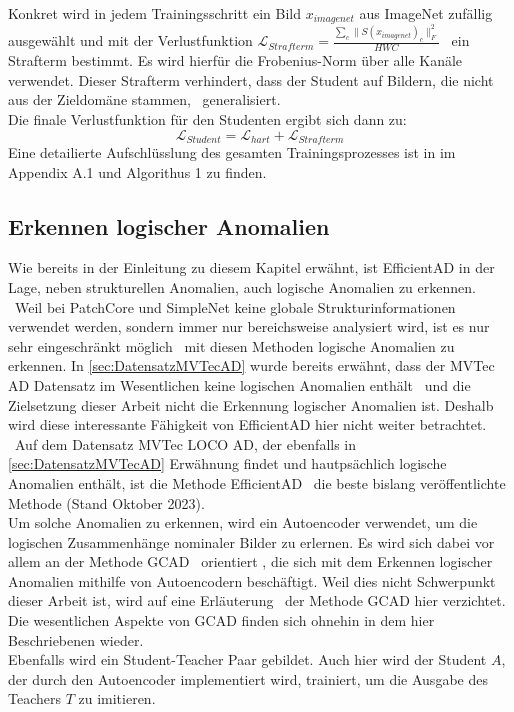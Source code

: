 Konkret wird in jedem Trainingsschritt ein Bild $x_{imagenet}$ aus ImageNet zufällig ausgewählt und mit der Verlustfunktion $\mathcal{L}_{Strafterm}=\frac{\sum_{c}\lVert S(x_{imagenet})_{c} \rVert^{2}_{F}}{HWC}$ \ 
ein Strafterm bestimmt. Es wird hierfür die Frobenius-Norm über alle Kanäle verwendet. Dieser Strafterm verhindert, dass der Student auf Bildern, die nicht aus der Zieldomäne stammen, \
generalisiert. \\
Die finale Verlustfunktion für den Studenten ergibt sich dann zu: \
$$
\mathcal{L}_{Student}= \mathcal{L}_{hart} + \mathcal{L}_{Strafterm} %
$$
Eine detailierte Aufschlüsslung des gesamten Trainingsprozesses ist in \cite{efficientad} im Appendix A.1 und Algorithus 1 zu finden. \\
\subsection{Erkennen logischer Anomalien}\label{subsec:erkennenlogischeranomalien}
Wie bereits in der Einleitung zu diesem Kapitel erwähnt, ist EfficientAD in der Lage, neben strukturellen Anomalien, auch logische Anomalien zu erkennen. \
Weil bei PatchCore und SimpleNet keine globale Strukturinformationen verwendet werden, sondern immer nur bereichsweise analysiert wird, ist es nur sehr eingeschränkt möglich \
mit diesen Methoden logische Anomalien zu erkennen. In \ref{sec:DatensatzMVTecAD} wurde bereits erwähnt, dass der MVTec AD Datensatz im Wesentlichen keine logischen Anomalien enthält \
und die Zielsetzung dieser Arbeit nicht die Erkennung logischer Anomalien ist. Deshalb wird diese interessante Fähigkeit von EfficientAD hier nicht weiter betrachtet. \
Auf dem Datensatz MVTec LOCO AD, der ebenfalls in \ref{sec:DatensatzMVTecAD} Erwähnung findet und hautpsächlich logische Anomalien enthält, ist die Methode EfficientAD \
die beste bislang veröffentlichte Methode (Stand Oktober 2023). \cite{mvtecadloco} \\
Um solche Anomalien zu erkennen, wird ein Autoencoder verwendet, um die logischen Zusammenhänge nominaler Bilder zu erlernen. Es wird sich dabei vor allem an der Methode \glqq GCAD\grqq{} \
orientiert \cite{gcad}, die sich mit dem Erkennen logischer Anomalien mithilfe von Autoencodern beschäftigt. Weil dies nicht Schwerpunkt dieser Arbeit ist, wird auf eine Erläuterung \
der Methode GCAD hier verzichtet. Die wesentlichen Aspekte von GCAD finden sich ohnehin in dem hier Beschriebenen wieder. \\
Ebenfalls wird ein Student-Teacher Paar gebildet. Auch hier wird der Student $A$, der durch den Autoencoder implementiert wird, trainiert, um die Ausgabe des Teachers $T$ zu imitieren. \
